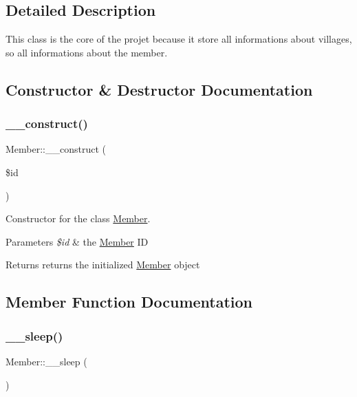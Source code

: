 \subsection{Detailed Description}
This class is the core of the projet because it store all informations about villages, so all informations about the member. 

\subsection{Constructor \& Destructor Documentation}
\mbox{\label{classMember_adfd583576ca6cc09f0f8868ac7c75f3a}} 
\subsubsection{\texorpdfstring{\+\_\+\+\_\+construct()}{\_\_construct()}}
{\footnotesize\ttfamily Member\+::\+\_\+\+\_\+construct (\begin{DoxyParamCaption}\item[{}]{\$id }\end{DoxyParamCaption})}



Constructor for the class \mbox{\hyperlink{classMember}{Member}}. 


\begin{DoxyParams}{Parameters}
{\em \$id} & the \mbox{\hyperlink{classMember}{Member}} ID \\
\hline
\end{DoxyParams}
\begin{DoxyReturn}{Returns}
returns the initialized \mbox{\hyperlink{classMember}{Member}} object 
\end{DoxyReturn}


\subsection{Member Function Documentation}
\mbox{\label{classMember_a08bdbef60afdd66ea4e1f3c2404d6b6f}} 
\subsubsection{\texorpdfstring{\+\_\+\+\_\+sleep()}{\_\_sleep()}}
{\footnotesize\ttfamily Member\+::\+\_\+\+\_\+sleep (\begin{DoxyParamCaption}{ }\end{DoxyParamCaption})}



